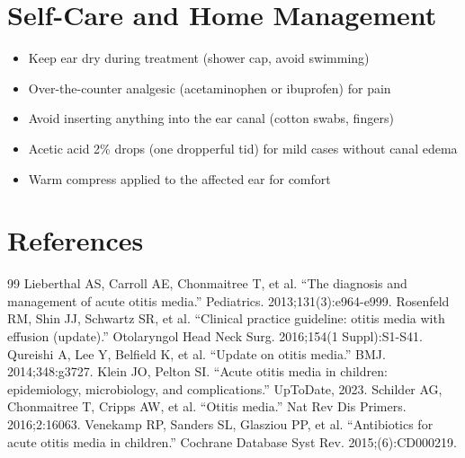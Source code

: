 \section*{Self-Care and Home Management}
\begin{itemize}
  \item Keep ear dry during treatment (shower cap, avoid swimming)
  \item Over-the-counter analgesic (acetaminophen or ibuprofen) for pain
  \item Avoid inserting anything into the ear canal (cotton swabs, fingers)
  \item Acetic acid 2\% drops (one dropperful tid) for mild cases without canal edema
  \item Warm compress applied to the affected ear for comfort
\end{itemize}

\section*{References}
\begin{thebibliography}{99}
 Lieberthal AS, Carroll AE, Chonmaitree T, et al. ``The diagnosis and management of acute otitis media.'' Pediatrics. 2013;131(3):e964-e999.
 Rosenfeld RM, Shin JJ, Schwartz SR, et al. ``Clinical practice guideline: otitis media with effusion (update).'' Otolaryngol Head Neck Surg. 2016;154(1 Suppl):S1-S41.
 Qureishi A, Lee Y, Belfield K, et al. ``Update on otitis media.'' BMJ. 2014;348:g3727.
 Klein JO, Pelton SI. ``Acute otitis media in children: epidemiology, microbiology, and complications.'' UpToDate, 2023.
 Schilder AG, Chonmaitree T, Cripps AW, et al. ``Otitis media.'' Nat Rev Dis Primers. 2016;2:16063.
 Venekamp RP, Sanders SL, Glasziou PP, et al. ``Antibiotics for acute otitis media in children.'' Cochrane Database Syst Rev. 2015;(6):CD000219.
\end{thebibliography}

